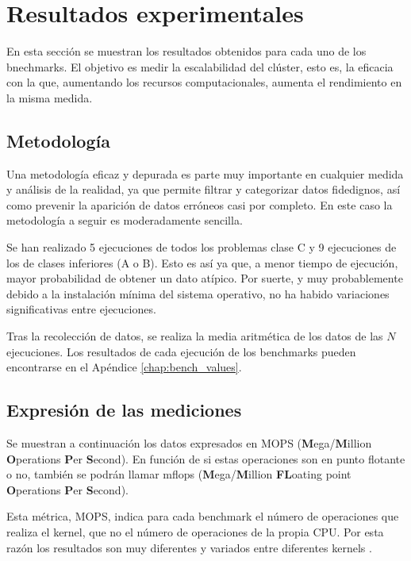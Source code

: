 \section{Resultados experimentales}
\label{sec:comparacion_resultados}
En esta sección se muestran los resultados obtenidos para cada uno de los bnechmarks. El objetivo es medir la escalabilidad del clúster, esto es, la eficacia con la que, aumentando los recursos computacionales, aumenta el rendimiento en la misma medida.

\subsection{Metodología}
Una metodología eficaz y depurada es parte muy importante en cualquier medida y análisis de la realidad, ya que permite filtrar y categorizar datos fidedignos, así como prevenir la aparición de datos erróneos casi por completo. En este caso la metodología a seguir es moderadamente sencilla.

Se han realizado 5 ejecuciones de todos los problemas clase C y 9 ejecuciones de los de clases inferiores (A o B). Esto es así ya que, a menor tiempo de ejecución, mayor probabilidad de obtener un dato atípico. Por suerte, y muy probablemente debido a la instalación mínima del sistema operativo, no ha habido variaciones significativas entre ejecuciones.

Tras la recolección de datos, se realiza la media aritmética de los datos de las $N$ ejecuciones. Los resultados de cada ejecución de los benchmarks pueden encontrarse en el Apéndice \ref{chap:bench_values}.

\subsection{Expresión de las mediciones}
Se muestran a continuación los datos expresados en MOPS (\textbf{M}ega/\textbf{M}illion \textbf{O}perations \textbf{P}er \textbf{S}econd). En función de si estas operaciones son en punto flotante o no, también se podrán llamar \acrshort{mflops} (\textbf{M}ega/\textbf{M}illion \textbf{FL}oating point \textbf{O}perations \textbf{P}er \textbf{S}econd).

Esta métrica, MOPS, indica para cada benchmark el número de operaciones que realiza el kernel, que no el número de operaciones de la propia CPU. Por esta razón los resultados son muy diferentes y variados entre diferentes kernels \cite{mallon2009npb}.

